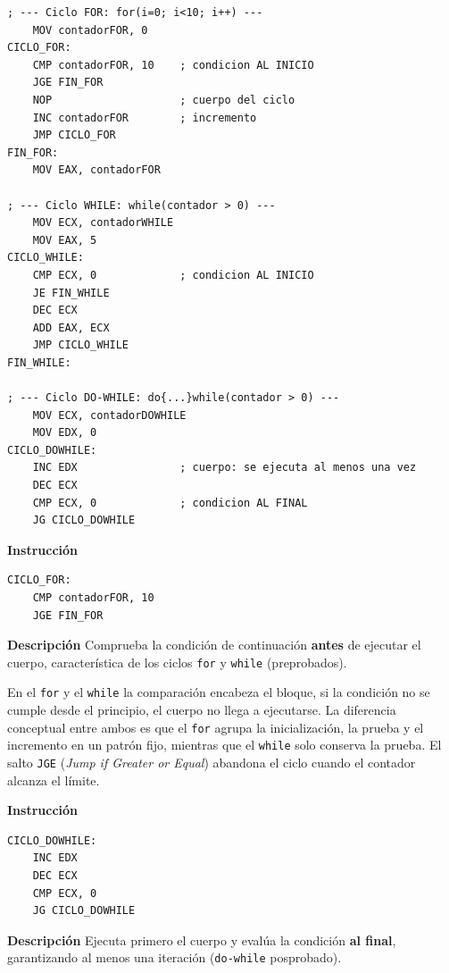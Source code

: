 \documentclass[a4paper,12pt]{article}
\begin{document}
\begin{lstlisting}[style=assemblyStyle, caption={Equivalentes en ensamblador de \texttt{for}, \texttt{while} y \texttt{do-while}.}, label={lst:ej3}]
; --- Ciclo FOR: for(i=0; i<10; i++) ---
    MOV contadorFOR, 0
CICLO_FOR:
    CMP contadorFOR, 10    ; condicion AL INICIO
    JGE FIN_FOR
    NOP                    ; cuerpo del ciclo
    INC contadorFOR        ; incremento
    JMP CICLO_FOR
FIN_FOR:
    MOV EAX, contadorFOR

; --- Ciclo WHILE: while(contador > 0) ---
    MOV ECX, contadorWHILE
    MOV EAX, 5
CICLO_WHILE:
    CMP ECX, 0             ; condicion AL INICIO
    JE FIN_WHILE
    DEC ECX
    ADD EAX, ECX
    JMP CICLO_WHILE
FIN_WHILE:

; --- Ciclo DO-WHILE: do{...}while(contador > 0) ---
    MOV ECX, contadorDOWHILE
    MOV EDX, 0
CICLO_DOWHILE:
    INC EDX                ; cuerpo: se ejecuta al menos una vez
    DEC ECX
    CMP ECX, 0             ; condicion AL FINAL
    JG CICLO_DOWHILE
\end{lstlisting}

\begin{instruccionbox}
\textbf{Instrucción}
\begin{lstlisting}
CICLO_FOR:
    CMP contadorFOR, 10
    JGE FIN_FOR
\end{lstlisting}
\textbf{Descripción}
Comprueba la condición de continuación \textbf{antes} de ejecutar el cuerpo, característica de los ciclos \texttt{for} y \texttt{while} (preprobados).
\end{instruccionbox}

En el \texttt{for} y el \texttt{while} la comparación encabeza el bloque, si la condición no se cumple desde el principio, el cuerpo no llega a ejecutarse. La diferencia conceptual entre ambos es que el \texttt{for} agrupa la inicialización, la prueba y el incremento en un patrón fijo, mientras que el \texttt{while} solo conserva la prueba. El salto \texttt{JGE} (\textit{Jump if Greater or Equal}) abandona el ciclo cuando el contador alcanza el límite.

\begin{instruccionbox}
\textbf{Instrucción}
\begin{lstlisting}
CICLO_DOWHILE:
    INC EDX
    DEC ECX
    CMP ECX, 0
    JG CICLO_DOWHILE
\end{lstlisting}
\textbf{Descripción}
Ejecuta primero el cuerpo y evalúa la condición \textbf{al final}, garantizando al menos una iteración (\texttt{do-while} posprobado).
\end{instruccionbox}
\end{document}
